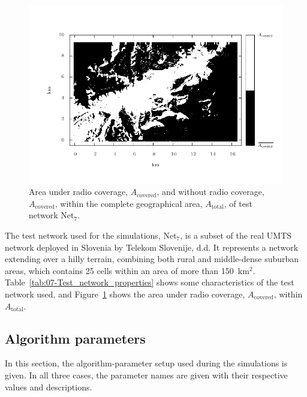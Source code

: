\begin{figure}
\centering

\includegraphics[width=1\textwidth]{07-experimental_evaluation-sho_balancing/img/coverage_area}

\caption{Area under radio coverage, $A_{\mathrm{covered}}$, and without radio
coverage, $\overline{A_{\mathrm{covered}}}$, within the complete
geographical area, $A_{\mathrm{total}}$, of test network Net$_{7}$.\label{fig:07-Coverage_areas}}
\end{figure}


\noindent The test network used for the simulations, Net$_{7}$, is
a subset of the real UMTS network deployed in Slovenia by Telekom
Slovenije, d.d. It represents a network extending over a hilly terrain,
combining both rural and middle-dense suburban areas, which contains
25 cells within an area of more than 150~km$^{2}$. Table~\ref{tab:07-Test_network_properties}
shows some characteristics of the test network used, and Figure~\ref{fig:07-Coverage_areas}
shows the area under radio coverage, $A_{\mathrm{covered}}$, within
$A_{\mathrm{total}}$.


\subsection{Algorithm parameters}

In this section, the algorithm-parameter setup used during the simulations
is given. In all three cases, the parameter names are given with their
respective values and descriptions.

